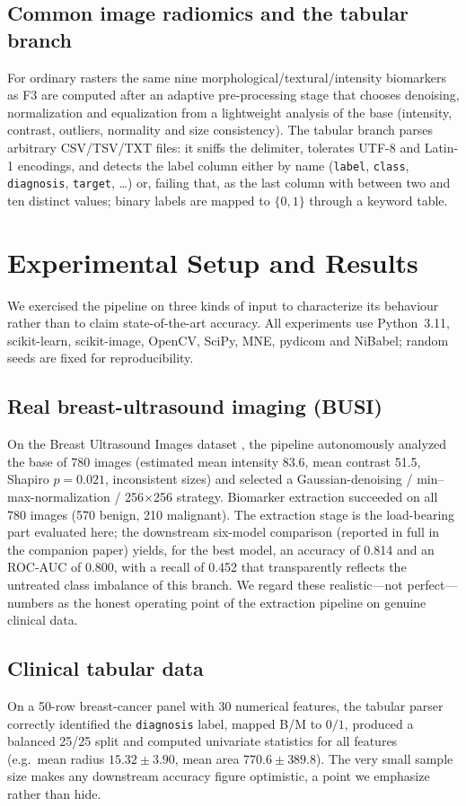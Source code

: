 \documentclass[conference]{IEEEtran}
\begin{document}
\subsection{Common image radiomics and the tabular branch}
For ordinary rasters the same nine morphological/textural/intensity biomarkers
as F3 are computed after an adaptive pre-processing stage that chooses denoising,
normalization and equalization from a lightweight analysis of the base
(intensity, contrast, outliers, normality and size consistency). The tabular
branch parses arbitrary CSV/TSV/TXT files: it sniffs the delimiter, tolerates
UTF-8 and Latin-1 encodings, and detects the label column either by name
(\texttt{label}, \texttt{class}, \texttt{diagnosis}, \texttt{target}, \dots) or,
failing that, as the last column with between two and ten distinct values;
binary labels are mapped to $\{0,1\}$ through a keyword table.

\section{Experimental Setup and Results}
We exercised the pipeline on three kinds of input to characterize its behaviour
rather than to claim state-of-the-art accuracy. All experiments use Python~3.11,
scikit-learn, scikit-image, OpenCV, SciPy, MNE, pydicom and NiBabel; random
seeds are fixed for reproducibility.

\subsection{Real breast-ultrasound imaging (BUSI)}
On the Breast Ultrasound Images dataset \cite{aldhabyani2020busi}, the pipeline
autonomously analyzed the base of 780 images (estimated mean intensity 83.6,
mean contrast 51.5, Shapiro $p{=}0.021$, inconsistent sizes) and selected a
Gaussian-denoising / min--max-normalization / 256$\times$256 strategy. Biomarker
extraction succeeded on all 780 images (570 benign, 210 malignant). The
extraction stage is the load-bearing part evaluated here; the downstream
six-model comparison (reported in full in the companion paper) yields, for the
best model, an accuracy of 0.814 and an ROC-AUC of 0.800, with a recall of
0.452 that transparently reflects the untreated class imbalance of this branch.
We regard these realistic---not perfect---numbers as the honest operating point
of the extraction pipeline on genuine clinical data.

\subsection{Clinical tabular data}
On a 50-row breast-cancer panel with 30 numerical features, the tabular parser
correctly identified the \texttt{diagnosis} label, mapped B/M to $0/1$, produced
a balanced 25/25 split and computed univariate statistics for all features
(e.g.\ mean radius $15.32\pm3.90$, mean area $770.6\pm389.8$). The very small
sample size makes any downstream accuracy figure optimistic, a point we
emphasize rather than hide.
\end{document}
